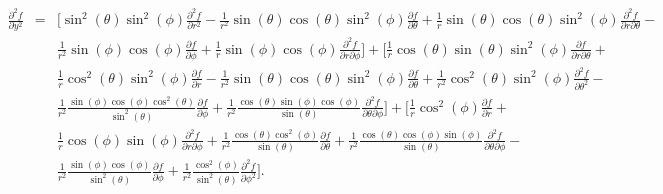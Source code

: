 \documentclass[12pt]{article}
\begin{document}
\begin{eqnarray*}
\frac{{\partial}^2 f}{\partial y^2} &=& \Big[{\sin}^2(\theta){\sin}^2(\phi)\frac{{\partial}^2 f}{\partial r^2} - \frac{1}{r^2}\sin(\theta)\cos(\theta){\sin}^2(\phi)\frac{\partial f}{\partial\theta} + \frac{1}{r}\sin(\theta)\cos(\theta){\sin}^2(\phi)\frac{{\partial}^2 f}{\partial r\partial\theta} - \\
& & \frac{1}{r^2}\sin(\phi)\cos(\phi)\frac{\partial f}{\partial\phi} + \frac{1}{r}\sin(\phi)\cos(\phi)\frac{{\partial}^2 f}{\partial r\partial\phi}\Big] + \Big[\frac{1}{r}\cos(\theta)\sin(\theta){\sin}^2(\phi)\frac{\partial f}{\partial r\partial\theta} + \\
& & \frac{1}{r}{\cos}^2(\theta){\sin}^2(\phi)\frac{\partial f}{\partial r} - \frac{1}{r^2}\sin(\theta)\cos(\theta){\sin}^2(\phi)\frac{\partial f}{\partial\theta} + \frac{1}{r^2}{\cos}^2(\theta){\sin}^2(\phi)\frac{{\partial}^2 f}{\partial{\theta}^2} - \\
& & \frac{1}{r^2}\frac{\sin(\phi)\cos(\phi){\cos}^2(\theta)}{{\sin}^2(\theta)}\frac{\partial f}{\partial\phi} + \frac{1}{r^2}\frac{\cos(\theta)\sin(\phi)\cos(\phi)}{\sin(\theta)}\frac{{\partial}^2 f}{\partial\theta\partial\phi}\Big] + \Big[\frac{1}{r}{\cos}^2(\phi)\frac{\partial f}{\partial r} + \\
& & \frac{1}{r}\cos(\phi)\sin(\phi)\frac{{\partial}^2 f}{\partial r\partial\phi} + \frac{1}{r^2}\frac{\cos(\theta){\cos}^2(\phi)}{\sin(\theta)}\frac{\partial f}{\partial\theta} + \frac{1}{r^2}\frac{\cos(\theta){\cos}(\phi)\sin(\phi)}{\sin(\theta)}\frac{{\partial}^2 f}{\partial\theta\partial\phi} - \\
& & \frac{1}{r^2}\frac{\sin(\phi)\cos(\phi)}{{\sin}^2(\theta)}\frac{\partial f}{\partial\phi} + \frac{1}{r^2}\frac{{\cos}^2(\phi)}{{\sin}^2(\theta)}\frac{{\partial}^2 f}{\partial{\phi}^2}\Big].
\end{eqnarray*}
\end{document}
